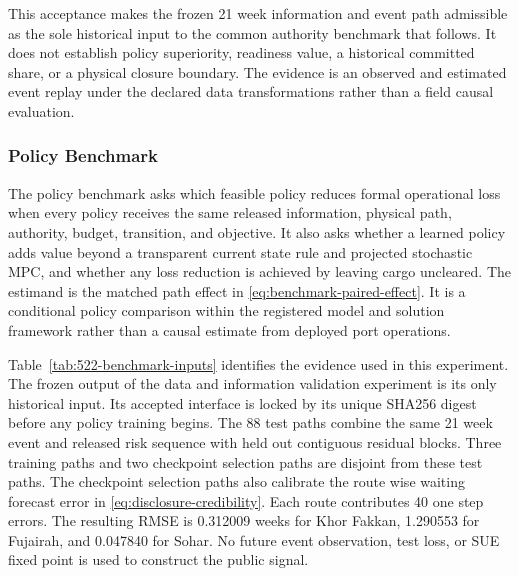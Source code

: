 \documentclass[a4paper,fleqn]{cas-sc}
\begin{document}
This acceptance makes the frozen 21 week information and event path admissible
as the sole historical input to the common authority benchmark that follows. It
does not establish policy superiority, readiness value, a historical committed
share, or a physical closure boundary. The evidence is an observed and
estimated event replay under the declared data transformations rather than a
field causal evaluation.

\FloatBarrier

\subsubsection{Policy Benchmark}
\label{subsubsec:common-authority-benchmark}

The policy benchmark asks which feasible policy reduces formal operational
loss when every policy receives the same released information, physical path,
authority, budget, transition, and objective. It also asks whether a learned
policy adds value beyond a transparent current state rule and projected
stochastic MPC, and whether any loss reduction is achieved by leaving cargo
uncleared. The estimand is the matched path effect in
\cref{eq:benchmark-paired-effect}. It is a conditional policy comparison within
the registered model and solution framework rather than a causal estimate from deployed
port operations.

Table~\ref{tab:522-benchmark-inputs} identifies the evidence used in this
experiment. The frozen output of the data and information validation experiment
is its only historical input.
Its accepted interface is locked by its unique SHA256 digest before any policy
training begins. The 88 test paths combine the same 21 week event and released
risk sequence with held out contiguous residual blocks. Three training paths
and two checkpoint selection paths are disjoint from these test paths. The
checkpoint selection paths also calibrate the route wise waiting forecast error in
\cref{eq:disclosure-credibility}. Each route contributes 40 one step errors.
The resulting RMSE is 0.312009 weeks for Khor Fakkan, 1.290553 for Fujairah,
and 0.047840 for Sohar. No future event observation, test loss, or SUE fixed
point is used to construct the public signal.
\end{document}
